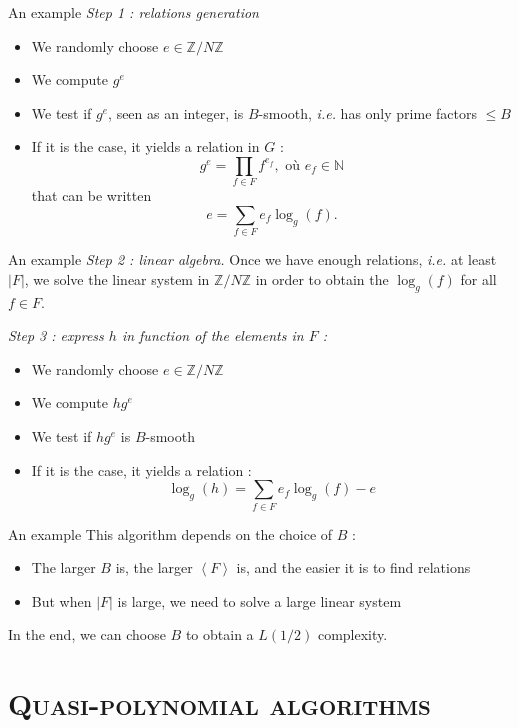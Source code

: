 \documentclass[xcolor=x11names,compress]{beamer}
\theoremstyle{break}
\theoremstyle{sc}
\theoremstyle{definition}
\theoremstyle{remark}
\newcommand{\ie}{\emph{i.e. }}
\begin{document}
\begin{frame}{An example}
  \emph{Step 1 : relations generation}
  \begin{itemize}
    \item We randomly choose $e\in \mathbb{Z}/N\mathbb{Z}$
    \item We compute $g^e$
    \item We test if $g^e$, seen as an integer, is $B$-smooth, \ie has only
      prime factors $\leq B$
    \item If it is the case, it yields a relation in $G$ :
      \[ 
        g^e = \prod_{f\in F}f^{e_f}, \text{ où } e_f\in \mathbb{N}
      \]
      that can be written
      \[
        e = \sum_{f\in F}e_f\log_g(f).
      \]
  \end{itemize}
\end{frame}

\begin{frame}{An example}
  \emph{Step 2 : linear algebra.} Once we have enough relations, \ie at least
  $|F|$, we solve the linear system in $\mathbb{Z}/N\mathbb{Z}$ in order to
  obtain the $\log_g(f)$ for all $f\in F$.
  
  \emph{Step 3 : express $h$ in function of the elements in $F$ :}
  \begin{itemize}
     \item We randomly choose $e\in \mathbb{Z}/N\mathbb{Z}$
    \item We compute $hg^e$
    \item We test if $hg^e$ is $B$-smooth
    \item If it is the case, it yields a relation  :
     \[
      \log_g(h) = \sum_{f\in F}e_f\log_g(f) - e
      \]
  \end{itemize}

\end{frame}

\begin{frame}{An example}
  This algorithm depends on the choice of $B$ :
  \begin{itemize}
    \item The larger $B$ is, the larger $\left\langle F \right\rangle$ is, and
      the easier it is to find relations
    \item But when $|F|$ is large, we need to solve a large linear system
  \end{itemize}
  In the end, we can choose $B$ to obtain a $L(1/2)$ complexity.
\end{frame}

\section{\scshape Quasi-polynomial algorithms} 
\end{document}
